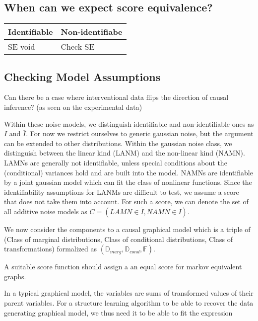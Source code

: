 \documentclass{article}
\begin{document}
\subsection{When can we expect score equivalence?}
\begin{table}[H]
    \centering
    \begin{tabular}{|l|l|}
        \textbf{Identifiable} & \textbf{Non-identifiabe}\\
        \hline
        SE void & Check SE\\
    \end{tabular}
\end{table}


\subsection{Checking Model Assumptions}
Can there be a case where interventional data flips the direction of causal inference? (as seen on the experimental data)

Within these noise models, we distinguish identifiable and non-identifiable ones as $I$ and $\bar{I}$.
For now we restrict ourselves to generic gaussian noise, but the argument can be extended to other distributions.
Within the gaussian noise class, we distinguish between the linear kind (LANM) and the non-linear kind (NAMN).
LAMNs are generally not identifiable, unless special conditions about the (conditional) variances hold  and are built into the model. 
NAMNs are identifiable by a joint gaussian model which can fit the class of nonlinear functions.
Since the identifiability assumptions for LANMs are difficult to test, we assume a score that does not take them into account.
For such a score, we can denote the set of all additive noise models as $C = (LAMN \in \bar{I}, NAMN \in I)$.

We now consider the components to a causal graphical model which is a triple of (Class of marginal distributions, Class of conditional distributions, Class of transformations) formalized as $(\mathbb{D}_{marg}, \mathbb{D}_{cond}, \mathbb{F})$.

A suitable score function should assign a an equal score for markov equivalent graphs.


In a typical graphical model, the variables are sums of transformed values of their parent variables. For a structure learning algorithm to be able to recover the data generating graphical model, we thus need it to be able to fit the expression
\end{document}
